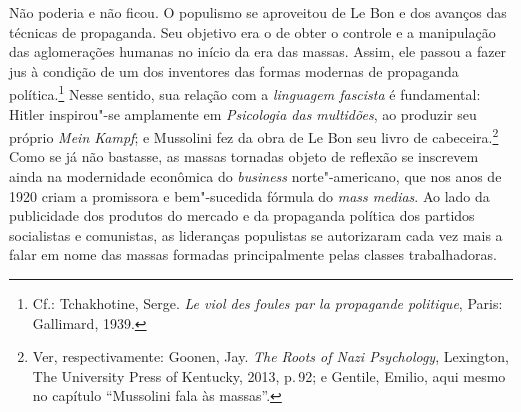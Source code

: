 Não poderia e não ficou. O populismo se aproveitou de Le Bon e dos
avanços das técnicas de propaganda. Seu objetivo era o de obter o
controle e a manipulação das aglomerações humanas no início da era das
massas. Assim, ele passou a fazer jus à condição de um dos inventores
das formas modernas de propaganda política.\footnote{Cf.: Tchakhotine,
  Serge. \emph{Le viol des foules par la propagande politique}, Paris:
  Gallimard, 1939.} Nesse sentido, sua relação com a
\emph{linguagem fascista} é fundamental: Hitler inspirou"-se
amplamente em \emph{Psicologia das multidões}, ao produzir seu próprio
\emph{Mein Kampf}; e Mussolini fez da obra de Le Bon seu livro de
cabeceira.\footnote{Ver, respectivamente: Goonen, Jay. \emph{The Roots of
  Nazi Psychology}, Lexington, The University Press of Kentucky, 2013,
  p.\,92; e Gentile, Emilio, aqui mesmo no capítulo ``Mussolini fala às
  massas''.} Como se já não bastasse, as massas tornadas objeto de
reflexão se inscrevem ainda na modernidade econômica do \emph{business}
norte"-americano, que nos anos de 1920 criam a promissora e bem"-sucedida
fórmula do \emph{mass medias}. Ao lado da publicidade dos produtos do
mercado e da propaganda política dos partidos socialistas e comunistas,
as lideranças populistas se autorizaram cada vez mais a falar em nome
das massas formadas principalmente pelas classes trabalhadoras.

